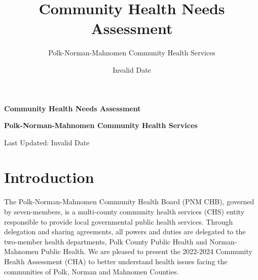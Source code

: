 \documentclass[
  a4paper,
  landscape]{scrreprt}
\title{Community Health Needs Assessment}
\subtitle{Polk-Norman-Mahnomen Community Health Services}
\author{}
\date{Invalid Date}
\renewcommand*\contentsname{Table of contents}
\newcommand\contentsname{Table of contents}
\begin{document}
\cleardoublepage
\thispagestyle{empty}
{\centering
\vspace*{1cm} %
{\Huge\bfseries Community Health Needs Assessment \par}

\vspace{3ex}
{\Large\bfseries Polk-Norman-Mahnomen Community Health Services \par}
 
\vspace{3ex} %
{\Large Last Updated: Invalid Date \par}


}
\renewcommand*\contentsname{Table of contents}
{
\hypersetup{linkcolor=}
\setcounter{tocdepth}{2}
\tableofcontents
}


\chapter{Introduction}\label{introduction}

The Polk-Norman-Mahnomen Community Health Board (PNM CHB), governed by
seven-members, is a multi-county community health services (CHS) entity
responsible to provide local governmental public health services.
Through delegation and sharing agreements, all powers and duties are
delegated to the two-member health departments, Polk County Public
Health and Norman-Mahnomen Public Health. We are pleased to present the
2022-2024 Community Health Assessment (CHA) to better understand health
issues facing the communities of Polk, Norman and Mahnomen Counties.
\end{document}
